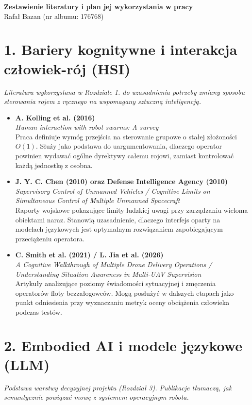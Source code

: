 \documentclass[12pt,a4paper]{article}
\newcommand{\lit}[3]{%
  \item
  \textbf{#1}\\[0.15em]
  \textit{#2}\\[0.35em]
  #3%
}
\begin{document}
\begin{center}
    {\Large \textbf{Zestawienie literatury i plan jej
    wykorzystania w pracy}}\\
    \vspace{0.3cm}
    {\large Rafał Bazan (nr albumu: 176768)}\\
\end{center}

\vspace{0.5cm}

\section*{1. Bariery kognitywne i interakcja człowiek-rój (HSI)}
\textit{Literatura wykorzystana w Rozdziale 1. do
uzasadnienia potrzeby zmiany sposobu sterowania rojem
z ręcznego na wspomagany sztuczną inteligencją.}

\begin{itemize}[leftmargin=*, itemsep=1.1em]
    \lit{A. Kolling et al. (2016)}
        {Human interaction with robot swarms: A survey}
        {Praca definiuje wymóg przejścia na sterowanie
        grupowe o stałej złożoności $O(1)$. Służy jako
        podstawa do uargumentowania, dlaczego operator
        powinien wydawać ogólne dyrektywy całemu rojowi,
        zamiast kontrolować każdą jednostkę z osobna.}

    \lit{J. Y. C. Chen (2010) oraz
        Defense Intelligence Agency (2010)}
        {Supervisory Control of Unmanned Vehicles /
        Cognitive Limits on Simultaneous Control of
        Multiple Unmanned Spacecraft}
        {Raporty wojskowe pokazujące limity ludzkiej
        uwagi przy zarządzaniu wieloma obiektami naraz.
        Stanowią uzasadnienie, dlaczego interfejs oparty
        na modelach językowych jest optymalnym
        rozwiązaniem zapobiegającym przeciążeniu
        operatora.}

    \lit{C. Smith et al. (2021) / L. Jia et al. (2026)}
        {A Cognitive Walkthrough of Multiple Drone
        Delivery Operations / Understanding Situation
        Awareness in Multi-UAV Supervision}
        {Artykuły analizujące poziomy świadomości
        sytuacyjnej i zmęczenia operatorów floty
        bezzałogowców. Mogą posłużyć w dalszych etapach
        jako punkt odniesienia przy wyznaczaniu metryk
        oceny obciążenia człowieka podczas testów.}
\end{itemize}

\section*{2. Embodied AI i modele językowe (LLM)}
\textit{Podstawa warstwy decyzyjnej projektu
(Rozdział 3). Publikacje tłumaczą, jak semantycznie
powiązać mowę z systemem operacyjnym robota.}
\end{document}

